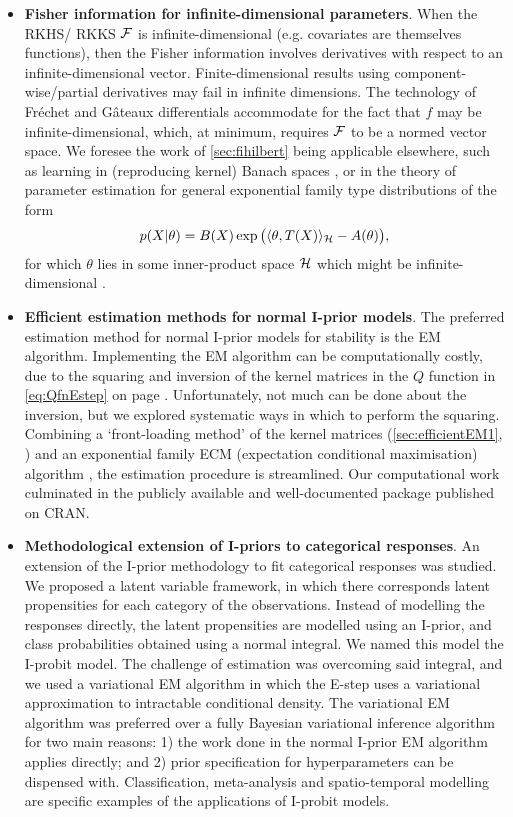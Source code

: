 \documentclass[showframe,11pt,twoside,openright]{report}
\begin{document}
\begin{itemize}
  \item \textbf{Fisher information for infinite-dimensional parameters}. 
  When the RKHS/ RKKS ${\mathcal F}$ is infinite-dimensional (e.g. covariates are themselves functions), then the Fisher information involves derivatives with respect to an infinite-dimensional vector.
  Finite-dimensional results using component-wise/partial derivatives may fail in infinite dimensions.
  The technology of Fréchet and Gâteaux differentials accommodate for the fact that $f$ may be infinite-dimensional, which, at minimum, requires ${\mathcal F}$ to be a  normed vector space. 
  We foresee the work of \cref{sec:fihilbert} being applicable elsewhere, such as learning in (reproducing kernel) Banach spaces \citep{zhang2009reproducing,zhang2012regularized}, or in the theory of parameter estimation for general exponential family type distributions of the form
  \[
    p(X|\theta) = B(X)\exp\big(\langle\theta,T(X)\rangle_{\mathcal H} - A(\theta) \big),
  \]
  for which $\theta$ lies in some inner-product space ${\mathcal H}$ which might be infinite-dimensional \citep{sriperumbudur2013density}.
  
  \item \textbf{Efficient estimation methods for normal I-prior models}. 
  The preferred estimation method for normal I-prior models for stability is the EM algorithm.
  Implementing the EM algorithm can be computationally costly, due to the squaring and inversion of the kernel matrices in the $Q$ function in \cref{eq:QfnEstep} on {\color{\mycitecolour}page} \pageref{eq:QfnEstep}.
  Unfortunately, not much can be done about the inversion, but we explored systematic ways in which to perform the squaring.
  Combining a `front-loading method' of the kernel matrices (\cref{sec:efficientEM1}, ) and an exponential family ECM (expectation conditional maximisation) algorithm \citep{meng1993maximum}, the estimation procedure is streamlined.
  Our computational work culminated in the publicly available and well-documented  package  \citep{jamil2017iprior} published on CRAN.
  
  \item \textbf{Methodological extension of I-priors to categorical responses}.
  An extension of the I-prior methodology to fit categorical responses was studied.
  We proposed a latent variable framework, in which there corresponds latent propensities for each category of the observations.
  Instead of modelling the responses directly, the latent propensities are modelled using an I-prior, and class probabilities obtained using a normal integral.
  We named this model the I-probit model.
  The challenge of estimation was overcoming said integral, and we used a variational EM algorithm in which the E-step uses a variational approximation to intractable conditional density.
  The variational EM algorithm was preferred over a fully Bayesian variational inference algorithm for two main reasons: 1) the work done in the normal I-prior EM algorithm applies directly; and 2) prior specification for hyperparameters can be dispensed with.
  Classification, meta-analysis and spatio-temporal modelling are specific examples of the applications of I-probit models.
  

\end{itemize}
\end{document}
